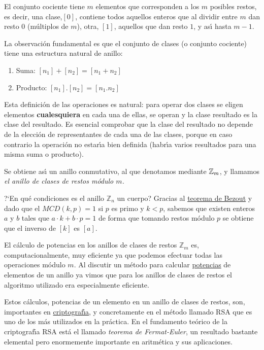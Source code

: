 El conjunto cociente tiene $m$ elementos que corresponden a los 
$m$ posibles restos, es decir, una clase,$[0]$, contiene todos 
aquellos enteros que al dividir entre $m$ dan resto $0$ (m\'ultiplos 
de $m$), otra, $[1]$, aquellos que dan resto $1$, y as\'{\i}  hasta $m-
1$.


La observaci\'on fundamental es que el conjunto de clases (o 
conjunto cociente) tiene una estructura natural de anillo:
\begin{enumerate}
\item Suma: $[n_1]+[n_2]=[n_1+n_2]$
\item Producto: $[n_1].[n_2]=[n_1. n_2]$
\end{enumerate}

Esta definici\'on de las operaciones es natural: para operar dos 
clases se eligen elementos {\bf cualesquiera} en cada una de ellas, 
se operan y la clase resultado es la clase del resultado.  Es 
esencial comprobar que la clase del resultado no depende de la 
elecci\'on de representantes de cada una de las clases, porque en 
caso contrario la operaci\'on no estar\'{\i}a bien definida (habr\'{\i}a varios resultados para una misma suma o producto). 

Se obtiene as\'{\i}   un 
anillo conmutativo, al que denotamos mediante $\Bbb Z_{m}$, y llamamos {\itshape
el anillo de clases de restos m\'odulo $m$.} 

?`En qu\'e condiciones es el anillo $\mathbb{Z}_{n}$ un cuerpo?  Gracias al
\hyperref[bezout]{teorema de Bezout} y dado que el $MCD(k,p)=1$ si
$p$ es primo y $k<p$, sabemos
que existen enteros $a$ y $b$ tales que $a\cdot k+b\cdot p=1$ de forma que
tomando restos m\'odulo $p$ se obtiene que el inverso de $[k]$ es $[a].$


El c\'alculo de potencias en los anillos de clases de restos $\mathbb{Z}_m$ es, 
computacionalmente, muy eficiente ya que podemos efectuar todas las operaciones
m\'odulo $m$. Al discutir  un m\'etodo para
calcular \hyperref[potencias]{potencias} de elementos de un anillo ya vimos que
para los anillos de clases de restos el algoritmo utilizado era  especialmente
eficiente.


Estos c\'alculos, potencias de un elemento en un anillo de clases de restos,
son, importantes en \hyperref[rsa]{criptograf\'{\i}a}, y concretamente
en el m\'etodo llamado RSA que es uno de los m\'as utilizados en la pr\'actica.
En el fundamento teórico de la criptograf\'{\i}a RSA est\'a el llamado
{\itshape teorema de Fermat-Euler}, un resultado bastante elemental pero
enormemente importante en aritm\'etica y sus aplicaciones.

